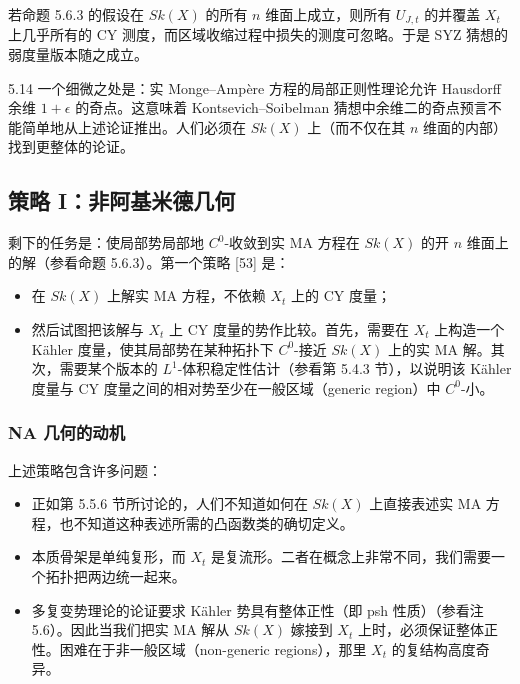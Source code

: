 
若命题 5.6.3 的假设在 $Sk(X)$ 的所有 $n$ 维面上成立，则所有 $U_{J,t}$ 的并覆盖 $X_t$ 上几乎所有的 CY 测度，而区域收缩过程中损失的测度可忽略。于是 SYZ 猜想的弱度量版本随之成立。

\begin{remark}{5.14}
一个细微之处是：实 Monge--Ampère 方程的局部正则性理论允许 Hausdorff 余维 $1+\epsilon$ 的奇点。这意味着 Kontsevich--Soibelman 猜想中余维二的奇点预言不能简单地从上述论证推出。人们必须在 $Sk(X)$ 上（而不仅在其 $n$ 维面的内部）找到更整体的论证。
\end{remark}


\subsection{策略 I：非阿基米德几何}
剩下的任务是：使局部势局部地 $C^0$-收敛到实 MA 方程在 $Sk(X)$ 的开 $n$ 维面上的解（参看命题 5.6.3）。第一个策略 [53] 是：
\begin{itemize}
\item 在 $Sk(X)$ 上解实 MA 方程，不依赖 $X_t$ 上的 CY 度量；
\item 然后试图把该解与 $X_t$ 上 CY 度量的势作比较。首先，需要在 $X_t$ 上构造一个 Kähler 度量，使其局部势在某种拓扑下 $C^0$-接近 $Sk(X)$ 上的实 MA 解。其次，需要某个版本的 $L^1$-体积稳定性估计（参看第 5.4.3 节），以说明该 Kähler 度量与 CY 度量之间的相对势至少在一般区域（generic region）中 $C^0$-小。
\end{itemize}

\subsubsection{NA 几何的动机}
上述策略包含许多问题：

\begin{itemize}
\item 正如第 5.5.6 节所讨论的，人们不知道如何在 $Sk(X)$ 上直接表述实 MA 方程，也不知道这种表述所需的凸函数类的确切定义。
\item 本质骨架是单纯复形，而 $X_t$ 是复流形。二者在概念上非常不同，我们需要一个拓扑把两边统一起来。
\item 多复变势理论的论证要求 Kähler 势具有整体正性（即 psh 性质）（参看注 5.6）。因此当我们把实 MA 解从 $Sk(X)$ 嫁接到 $X_t$ 上时，必须保证整体正性。困难在于非一般区域（non-generic regions），那里 $X_t$ 的复结构高度奇异。
\end{itemize}

